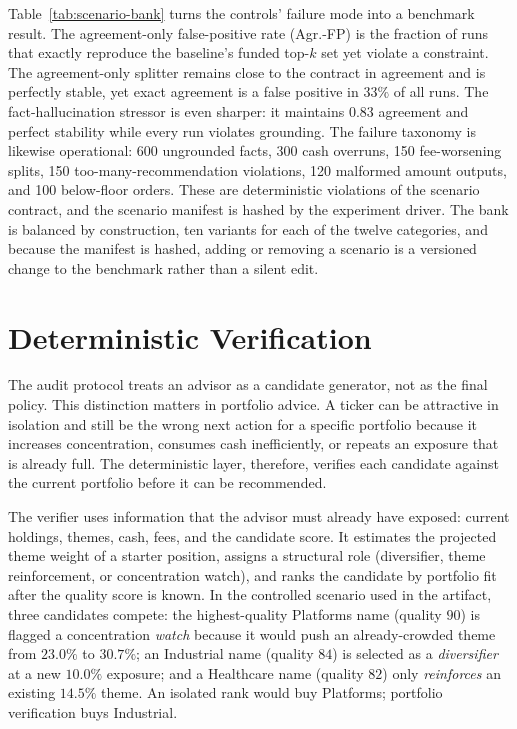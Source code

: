 \documentclass[sigconf,review,anonymous]{acmart}
\begin{document}
Table~\ref{tab:scenario-bank} turns the controls' failure mode into a benchmark result. The agreement-only false-positive rate (Agr.-FP) is the fraction of runs that exactly reproduce the baseline's funded top-$k$ set yet violate a constraint. The agreement-only splitter remains close to the contract in agreement and is perfectly stable, yet exact agreement is a false positive in $33\%$ of all runs. The fact-hallucination stressor is even sharper: it maintains $0.83$ agreement and perfect stability while every run violates grounding. The failure taxonomy is likewise operational: 600 ungrounded facts, 300 cash overruns, 150 fee-worsening splits, 150 too-many-recommendation violations, 120 malformed amount outputs, and 100 below-floor orders. These are deterministic violations of the scenario contract, and the scenario manifest is hashed by the experiment driver. The bank is balanced by construction, ten variants for each of the twelve categories, and because the manifest is hashed, adding or removing a scenario is a versioned change to the benchmark rather than a silent edit.

\section{Deterministic Verification}
\label{sec:portfolio-verification}
\label{sec:fees}
\label{sec:guardrail}

The audit protocol treats an advisor as a candidate generator, not as the final policy. This distinction matters in portfolio advice. A ticker can be attractive in isolation and still be the wrong next action for a specific portfolio because it increases concentration, consumes cash inefficiently, or repeats an exposure that is already full. The deterministic layer, therefore, verifies each candidate against the current portfolio before it can be recommended.

The verifier uses information that the advisor must already have exposed: current holdings, themes, cash, fees, and the candidate score. It estimates the projected theme weight of a starter position, assigns a structural role (diversifier, theme reinforcement, or concentration watch), and ranks the candidate by portfolio fit after the quality score is known. In the controlled scenario used in the artifact, three candidates compete: the highest-quality Platforms name (quality $90$) is flagged a concentration \emph{watch} because it would push an already-crowded theme from $23.0\%$ to $30.7\%$; an Industrial name (quality $84$) is selected as a \emph{diversifier} at a new $10.0\%$ exposure; and a Healthcare name (quality $82$) only \emph{reinforces} an existing $14.5\%$ theme. An isolated rank would buy Platforms; portfolio verification buys Industrial.
\end{document}
